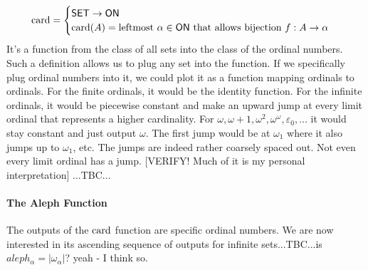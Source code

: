 \begin{equation}
\operatorname{card} = 
\begin{cases}
\mathsf{SET} \rightarrow \mathsf{ON} \\
\operatorname{card}(A) = \text{leftmost } \alpha \in \mathsf{ON} \text{ that allows bijection } 
           f: A \rightarrow \alpha
\end{cases}
\end{equation}
It's a function from the class of all sets into the class of the ordinal numbers. Such a definition allows us to plug any set into the function. If we specifically plug ordinal numbers into it, we could plot it as a function mapping ordinals to ordinals. For the finite ordinals, it would be the identity function. For the infinite ordinals, it would be piecewise constant and make an upward jump at every limit ordinal that represents a higher cardinality. For $\omega, \omega+1, \omega^2, \omega^\omega, \varepsilon_0, \ldots$ it would stay constant and just output $\omega$. The first jump would be at $\omega_1$ where it also jumps up to $\omega_1$, etc. The jumps are indeed rather coarsely spaced out. Not even every limit ordinal has a jump. [VERIFY! Much of it is my personal interpretation] ...TBC...



\paragraph{The Aleph Function} 
The outputs of the $\operatorname{card}$ function are specific ordinal numbers. We are now interested in its ascending sequence of outputs for infinite sets...TBC...is $aleph_{\alpha} = |\omega_{\alpha}|$? yeah - I think so.




